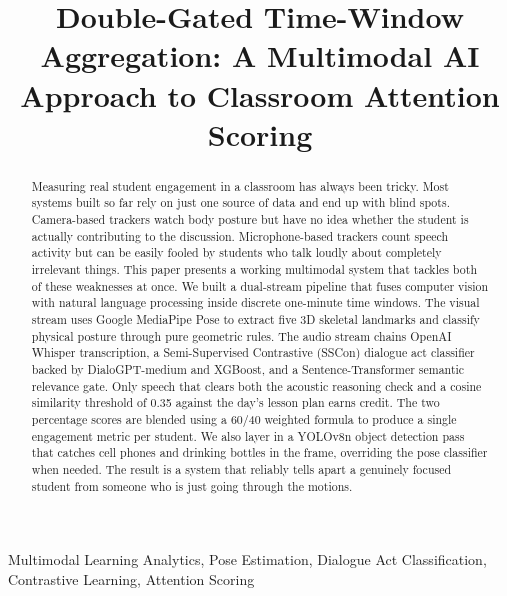 \documentclass[conference]{IEEEtran}
\begin{document}
\title{Double-Gated Time-Window Aggregation: A Multimodal AI Approach to Classroom Attention Scoring}

\author{
}

\maketitle

\begin{abstract}
Measuring real student engagement in a classroom has always been tricky. Most systems built so far rely on just one source of data and end up with blind spots. Camera-based trackers watch body posture but have no idea whether the student is actually contributing to the discussion. Microphone-based trackers count speech activity but can be easily fooled by students who talk loudly about completely irrelevant things. This paper presents a working multimodal system that tackles both of these weaknesses at once. We built a dual-stream pipeline that fuses computer vision with natural language processing inside discrete one-minute time windows. The visual stream uses Google MediaPipe Pose to extract five 3D skeletal landmarks and classify physical posture through pure geometric rules. The audio stream chains OpenAI Whisper transcription, a Semi-Supervised Contrastive (SSCon) dialogue act classifier backed by DialoGPT-medium and XGBoost, and a Sentence-Transformer semantic relevance gate. Only speech that clears both the acoustic reasoning check and a cosine similarity threshold of 0.35 against the day's lesson plan earns credit. The two percentage scores are blended using a 60/40 weighted formula to produce a single engagement metric per student. We also layer in a YOLOv8n object detection pass that catches cell phones and drinking bottles in the frame, overriding the pose classifier when needed. The result is a system that reliably tells apart a genuinely focused student from someone who is just going through the motions.
\end{abstract}

\begin{IEEEkeywords}
Multimodal Learning Analytics, Pose Estimation, Dialogue Act Classification, Contrastive Learning, Attention Scoring
\end{IEEEkeywords}
\end{document}
